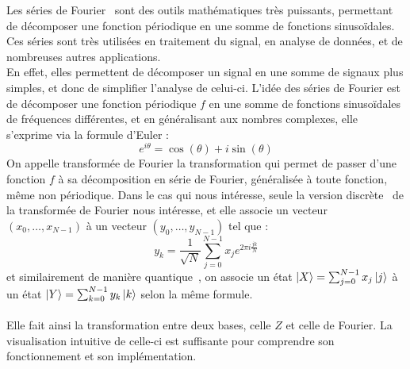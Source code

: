 Les séries de Fourier~\cite{wiki:serie-fourier} sont des outils mathématiques très puissants, permettant
de décomposer une fonction périodique en une somme de fonctions sinusoïdales.
Ces séries sont très utilisées en traitement du signal, en analyse de données,
et de nombreuses autres applications.\\
En effet, elles permettent de décomposer un signal en une somme de signaux plus
simples, et donc de simplifier l'analyse de celui-ci.
L'idée des séries de Fourier est de décomposer une fonction périodique $f$ en une
somme de fonctions sinusoïdales de fréquences différentes, et en généralisant
aux nombres complexes, elle s'exprime via la formule d'Euler :
\[
    e^{i\theta} = \cos(\theta) + i\sin(\theta)
\]
On appelle transformée de Fourier la transformation qui permet de passer d'une
fonction $f$ à sa décomposition en série de Fourier, généralisée à toute fonction,
même non périodique.
Dans le cas qui nous intéresse, seule la version discrète~\cite{wiki:transformee-fourier-disc} de la transformée de
Fourier nous intéresse, et elle associe un vecteur $(x_0, \ldots, x_{N-1})$ à un
vecteur $(y_0, \ldots, y_{N-1})$ tel que :
\[
    y_k = \frac{1}{\sqrt{N}} \sum_{j=0}^{N-1} x_j e^{2\pi i \frac{jk}{N}}
\]
et similairement de manière quantique~\cite{wiki:qft}, on associe un état $\ket{X} = \sum_{j=0}^{N-1} x_j \ket{j}$
à un état $\ket{Y} = \sum_{k=0}^{N-1} y_k \ket{k}$ selon la même formule.\\ \\
Elle fait ainsi la transformation entre deux bases, celle $Z$ et celle de Fourier.
La visualisation intuitive de celle-ci est suffisante pour comprendre son fonctionnement
et son implémentation.

